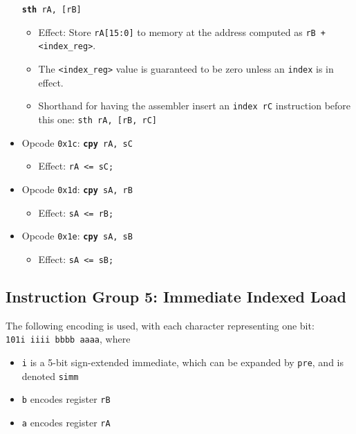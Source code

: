\documentclass{article}
\begin{document}
\begin{itemize}
		\texttt{\textbf{sth} rA, [rB]}
		\begin{itemize}
		\item Effect: Store \texttt{rA[15:0]} to memory at the address
		computed as \texttt{rB + <index\_reg>}.
		\item The \texttt{<index\_reg>} value is guaranteed to be zero
		unless an \texttt{index} is in effect.
		\item Shorthand for having the assembler insert an
		\texttt{index rC} instruction before this one:
			\texttt{sth rA, [rB, rC]}
		\end{itemize}
	\item Opcode \texttt{0x1c}:
		\texttt{\textbf{cpy} rA, sC}
		\begin{itemize}
		\item Effect: \texttt{rA <= sC;}
		\end{itemize}
	\item Opcode \texttt{0x1d}:
		\texttt{\textbf{cpy} sA, rB}
		\begin{itemize}
		\item Effect: \texttt{sA <= rB;}
		\end{itemize}
	\item Opcode \texttt{0x1e}:
		\texttt{\textbf{cpy} sA, sB}
		\begin{itemize}
		\item Effect: \texttt{sA <= sB;}
		\end{itemize}
	\end{itemize}

	\doublespacing
	\subsection{Instruction Group 5: Immediate Indexed Load}
	The following encoding is used, with each character representing one
	bit: \\
	\texttt{101i iiii bbbb aaaa}, where

	\singlespacing
	\begin{itemize}
	\item \texttt{i} is a 5-bit sign-extended immediate, which can
	be expanded by \texttt{pre}, and is denoted \texttt{simm}
	\item \texttt{b} encodes register \texttt{rB}
	\item \texttt{a} encodes register \texttt{rA}
	\end{itemize}
	\doublespacing
\end{document}
